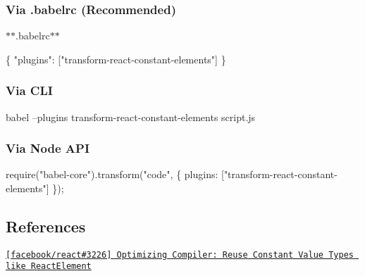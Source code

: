 \subsubsection*{Via {\ttfamily .babelrc} (Recommended)}

$\ast$$\ast$.babelrc$\ast$$\ast$


\begin{DoxyCode}
\{
  "plugins": ["transform-react-constant-elements"]
\}
\end{DoxyCode}


\subsubsection*{Via C\+LI}


\begin{DoxyCode}
babel --plugins transform-react-constant-elements script.js
\end{DoxyCode}


\subsubsection*{Via Node A\+PI}


\begin{DoxyCode}
require("babel-core").transform("code", \{
  plugins: ["transform-react-constant-elements"]
\});
\end{DoxyCode}


\subsection*{References}


\begin{DoxyItemize}
\item \href{https://github.com/facebook/react/issues/3226}{\tt \mbox{[}facebook/react\#3226\mbox{]} Optimizing Compiler\+: Reuse Constant Value Types like React\+Element} 
\end{DoxyItemize}